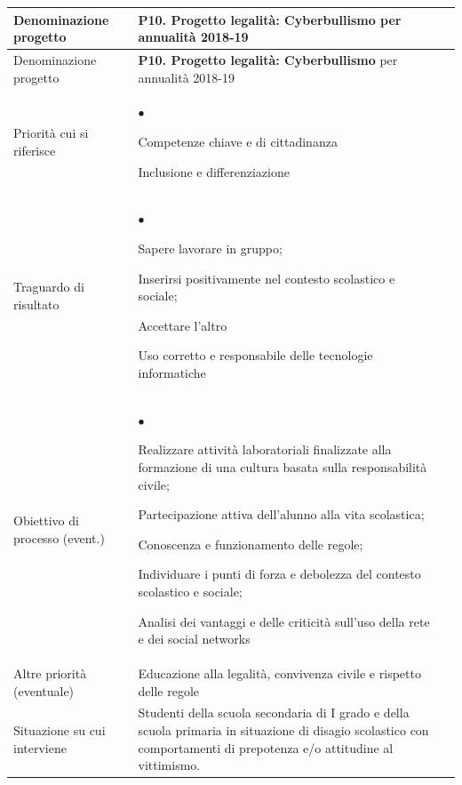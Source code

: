 \documentclass[12pt,a4paper,oneside]{memoir}
\newenvironment{elenco}{\begin{list}{$\bullet$}{%
              \setlength{\leftmargin}{4mm}%
              \setlength{\rightmargin}{1mm}%
               \setlength{\itemindent}{0mm}%
               \setlength{\labelwidth}{2mm}%
               \setlength{\labelsep}{2mm}%
              \setlength{\itemsep}{-\parsep}%
              \setlength{\partopsep}{0pt}%
              \setlength{\topsep}{0pt}%
             \setlength{\parskip}{0pt}%
              }}{\end{list}}
\begin{document}
\begin{footnotesize}
\begin{longtable}{|>{\raggedright}p{2.5cm}|>{\raggedright\arraybackslash}P{10cm}|}
\hline
{}
\label{P10}Denominazione progetto&\textbf{P10. Progetto legalità: Cyberbullismo} per annualità 2018-19\\ \hline \endfirsthead
\hline
{}
Denominazione progetto&\textbf{P10. Progetto legalità: Cyberbullismo} per annualità 2018-19\\ \hline \endhead
{}
\endfoot
\hline
\endlastfoot
Priorità cui si riferisce&\begin{elenco}
\item Competenze chiave e di cittadinanza
\item Inclusione e differenziazione
\end{elenco}\\[-4mm] \hline
Traguardo di risultato&
\begin{elenco}
\item Sapere lavorare in gruppo; 
\item Inserirsi positivamente nel contesto scolastico e sociale;
\item Accettare l'altro
\item Uso corretto e responsabile delle tecnologie informatiche
\end{elenco}\\[-4mm] \hline
Obiettivo di processo (event.)&
\begin{elenco}
\item Realizzare attività laboratoriali finalizzate alla formazione di una cultura basata sulla responsabilità civile;
\item Partecipazione attiva dell'alunno alla vita scolastica;
\item Conoscenza e funzionamento delle regole;
\item Individuare i punti di forza e debolezza del contesto scolastico e sociale;
\item Analisi dei vantaggi e delle criticità sull'uso della rete e dei social networks
\end{elenco}\\[-4mm] \hline
Altre priorità (eventuale)&Educazione alla legalità, convivenza civile e rispetto delle regole\\ \hline
Situazione su cui interviene&Studenti della scuola secondaria di I grado e della scuola primaria in situazione di disagio scolastico con comportamenti di prepotenza e/o attitudine al vittimismo.\\ \hline

\end{longtable}
\end{footnotesize}
\end{document}
